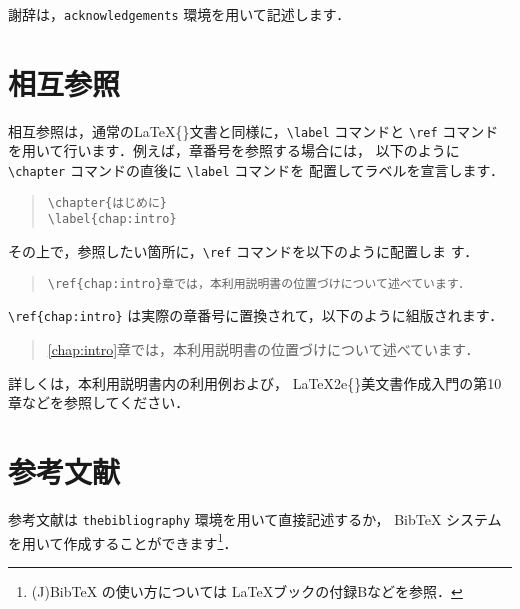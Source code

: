 \documentclass[
  sotsuron]{kuee}
\begin{document}
謝辞は，\verb+acknowledgements+ 環境を用いて記述します．

\hypertarget{ux76f8ux4e92ux53c2ux7167}{%
\section{相互参照}\label{ux76f8ux4e92ux53c2ux7167}}

\label{cross_reference}
相互参照は，通常の\LaTeX\{\}文書と同様に，\verb+\label+ コマンドと
\verb+\ref+ コマンドを用いて行います．例えば，章番号を参照する場合には，
以下のように \verb+\chapter+ コマンドの直後に \verb+\label+ コマンドを
配置してラベルを宣言します．

\begin{quote}
  \begin{verbatim}
\chapter{はじめに}
\label{chap:intro}
\end{verbatim}
\end{quote}

その上で，参照したい箇所に，\verb+\ref+ コマンドを以下のように配置しま
す．

\begin{quote}
  \begin{verbatim}
\ref{chap:intro}章では，本利用説明書の位置づけについて述べています．
\end{verbatim}
\end{quote}

\verb+\ref{chap:intro}+
は実際の章番号に置換されて，以下のように組版されます．

\begin{quote}
  \ref{chap:intro}章では，本利用説明書の位置づけについて述べています．
\end{quote}

詳しくは，本利用説明書内の利用例および，
\LaTeX2e\{\}美文書作成入門\cite{GuideBook}の第10章などを参照してください．

\hypertarget{ux53c2ux8003ux6587ux732e}{%
\section{参考文献}\label{ux53c2ux8003ux6587ux732e}}

参考文献は \verb+thebibliography+ 環境を用いて直接記述するか， BibTeX
システムを用いて作成することができます\footnote{(J)BibTeX
  の使い方については \LaTeX ブック\cite{LaTeX}の付録Bなどを参照．}．
\end{document}
